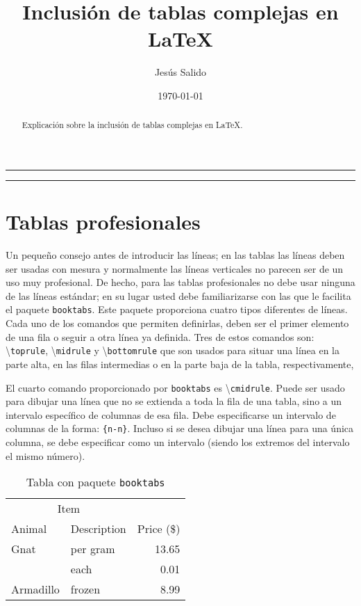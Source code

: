\documentclass[11pt,a4paper]{article}
\author{Jesús Salido}
\title{Inclusión de tablas complejas en \LaTeX{}}
\date{\today}
\begin{document}
\maketitle
\begin{abstract}
	Explicación sobre la inclusión de tablas complejas en \LaTeX{}.
\end{abstract}

\hrule
\tableofcontents
\listoftables
\bigskip
\hrule



\newpage
\section{Tablas profesionales}
Un pequeño consejo antes de introducir las líneas; en las tablas las líneas deben ser usadas con mesura y normalmente las líneas verticales no parecen ser de un uso muy profesional. De hecho, para las tablas profesionales no debe usar ninguna de las líneas estándar; en su lugar usted debe familiarizarse con las que le facilita el paquete \texttt{booktabs}. Este paquete proporciona cuatro tipos diferentes de líneas. Cada uno de los comandos que permiten definirlas, deben ser el primer elemento de una fila o seguir a otra línea ya definida. Tres de estos comandos son: \textbackslash \texttt{toprule}, \textbackslash \texttt{midrule} y \textbackslash \texttt{bottomrule} que son usados para situar una línea en la parte alta, en las filas intermedias o en la parte baja de la tabla, respectivamente, 

El cuarto comando proporcionado por \texttt{booktabs} es \textbackslash \texttt{cmidrule}. Puede ser usado para dibujar una línea que no se extienda a toda la fila de una tabla, sino a un intervalo específico de columnas de esa fila. Debe especificarse un intervalo de columnas de la forma: \texttt{\{n-n\}}. Incluso si se desea dibujar una línea para una única columna, se debe especificar como un intervalo (siendo los extremos del intervalo el mismo número).

\begin{table}[H]
   \centering
   	  \caption{Tabla con paquete \texttt{booktabs}}
   	  \label{tab:booktabs}      
   	  \begin{tabular}{llr}
      \toprule
      \multicolumn{2}{c}{Item} \\
      \cmidrule(r){1-2}
      Animal & Description & Price (\$) \\
      \midrule
      Gnat  & per gram & 13.65 \\
            & each     &  0.01 \\
      Armadillo & frozen & 8.99 \\
      \bottomrule
      \end{tabular}
\end{table}
\end{document}
